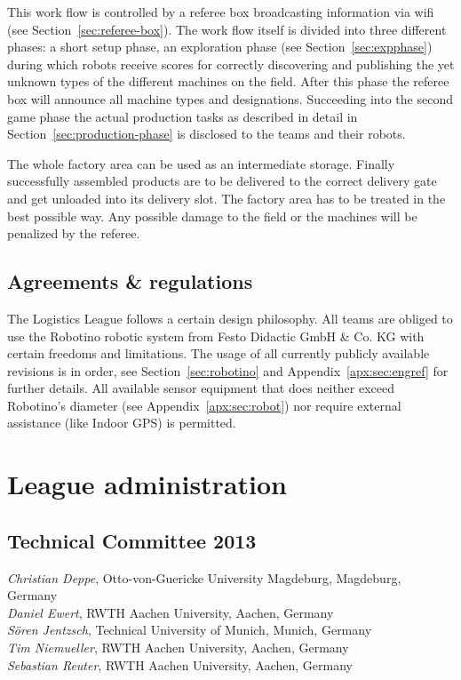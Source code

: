\documentclass[12pt,twoside]{article}
\newcommand{\refsec}[1]{Section~\ref{#1}}
\begin{document}
This work flow is controlled by a referee box broadcasting information
via wifi (see \refsec{sec:referee-box}). The work flow itself is
divided into three different phases: a short setup phase, an
exploration phase (see \refsec{sec:expphase}) during which robots
receive scores for correctly discovering and publishing the yet
unknown types of the different machines on the field. After this phase
the referee box will announce all machine types and
designations. Succeeding into the second game phase the actual
production tasks as described in detail in
\refsec{sec:production-phase} is disclosed to the teams and their
robots.

The whole factory area can be used as an intermediate storage. Finally
successfully assembled products are to be delivered to the correct
delivery gate and get unloaded into its delivery slot. The factory area
has to be treated in the best possible way. Any possible damage to the
field or the machines will be penalized by the referee.

\subsection{Agreements \& regulations} \label{sec:agreements}

The Logistics League follows a certain design philosophy. All teams
are obliged to use the Robotino robotic system from Festo Didactic
GmbH \& Co. KG with certain freedoms and limitations. The usage of all
currently publicly available revisions is in order, see
\refsec{sec:robotino} and Appendix~\ref{apx:sec:engref} for further
details. All available sensor equipment that does neither exceed
Robotino's diameter (see Appendix~\ref{apx:sec:robot}) nor require
external assistance (like Indoor GPS) is permitted.




\section{League administration} \label{sec:commitees}
\subsection{Technical Committee 2013} \label{sec:tc}
\emph{Christian Deppe}, Otto-von-Guericke University Magdeburg, Magdeburg,
Germany\\
\emph{Daniel Ewert}, RWTH Aachen University, Aachen, Germany\\
\emph{S\"oren Jentzsch}, Technical University of Munich, Munich, Germany\\
\emph{Tim Niemueller}, RWTH Aachen University, Aachen, Germany\\
\emph{Sebastian Reuter}, RWTH Aachen University, Aachen, Germany
\end{document}

